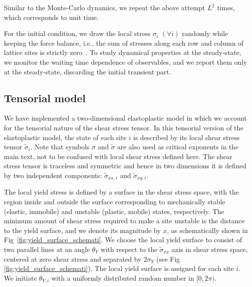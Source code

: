 \documentclass[pre,twocolumn,superscriptaddress,tightenlines,showpacs,longbibliography,floatfix,footinbib]{revtex4-1}
\begin{document}
Similar to the Monte-Carlo dynamics, we repeat the above attempt $L^2$ times, which corresponds to unit time.

For the initial condition, we draw the local stress $\sigma_i$ $(\forall i)$ randomly while keeping the force balance, i.e., the sum of stresses along
each row and column of lattice sites is strictly zero~\cite{popovic2018elastoplastic,pollard2022yielding}.
To study dynamical properties at the steady-state, we monitor the waiting time dependence of observables, and we report them only at the steady-state, discarding the initial transient part.



\subsection{Tensorial model}

We have implemented a two-dimensional elastoplastic model in which we account for the tensorial nature of the shear stress tensor. In this tensorial version of the elastoplastic model, the state of each site $i$ is described by its local shear stress tensor $\tilde{\sigma}_i$. Note that symbols $\sigma$ and $\tilde \sigma$ are also used as critical exponents in the main text, not to be confused with local shear stress defined here. The shear stress tensor is traceless and symmetric and hence in two dimensions it is defined by two independent components: $\tilde{\sigma}_{xx, i}$ and $\tilde{\sigma}_{xy, i}$. 


The local yield stress is defined by a surface in the shear stress space, with the region inside and outside the surface corresponding to mechanically stable (elastic, immobile) and unstable (plastic, mobile) states, respectively.
The minimum amount of shear stress required to make a site unstable is the distance to the yield surface, and we denote its magnitude by $x$, as schematically shown in Fig~\ref{fig:yield_surface_schemati}.
We choose the local yield surface to consist of two parallel lines at an angle $\theta_{Y}$ with respect to the $\tilde\sigma_{xx}$ axis in shear stress space, centered at zero shear stress and separated by $2 \sigma_Y$ (see Fig \ref{fig:yield_surface_schemati}).
The local yield surface is assigned for each site $i$.
We initiate $\theta_{Y,i}$ with a uniformly distributed random number in $[0, 2\pi)$.
\end{document}
